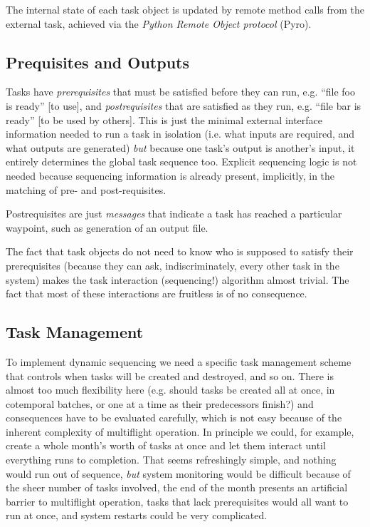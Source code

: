 \documentclass[11pt,a4paper]{report}
\begin{document}
The internal state of each task object is updated by remote method
calls from the external task, achieved via the {\em Python Remote Object
protocol} (Pyro). 

\subsection{Prequisites and Outputs}

Tasks have {\em prerequisites} that must be satisfied before they can
run, e.g. ``file foo is ready'' [to use], and {\em postrequisites} that
are satisfied as they run, e.g. ``file bar is ready'' [to be used by
others]. This is just the minimal external interface information needed
to run a task in isolation (i.e. what inputs are required, and what
outputs are generated) {\em but} because one task's output is another's
input, it entirely determines the global task sequence too. Explicit
sequencing logic is not needed because sequencing information is already
present, implicitly, in the matching of pre- and post-requisites. 

Postrequisites are just {\em messages} that indicate a task has reached
a particular waypoint, such as generation of an output file. 

The fact that task objects do not need to know who is supposed to
satisfy their prerequisites (because they can ask, indiscriminately,
every other task in the system) makes the task interaction (sequencing!)
algorithm almost trivial. The fact that most of these interactions
are fruitless is of no consequence. 

\subsection{Task Management}

To implement dynamic sequencing we need a specific task management
scheme that controls when tasks will be created and destroyed, and so
on. There is almost too much flexibility here (e.g.  should tasks be
created all at once, in cotemporal batches, or one at a time as their
predecessors finish?) and consequences have to be evaluated carefully,
which is not easy because of the inherent complexity of multiflight
operation. In principle we could, for example, create a whole month's
worth of tasks at once and let them interact until everything runs to
completion. That seems refreshingly simple, and nothing would run out of
sequence, {\em but} system monitoring would be difficult because of the
sheer number of tasks involved, the end of the month presents an
artificial barrier to multiflight operation, tasks that lack
prerequisites would all want to run at once, and system restarts could
be very complicated. 
\end{document}
